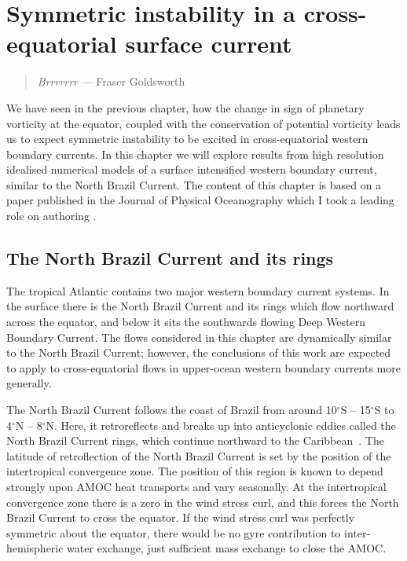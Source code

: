 \chapter{Symmetric instability in a cross-equatorial surface current}
\label{chap:3}
\begin{quote}
    \textit{Brrrrrrr} --- Fraser Goldsworth
\end{quote}

We have seen in the previous chapter, how the change in sign of planetary vorticity at the equator, coupled with the conservation of potential vorticity leads us to expect symmetric instability to be excited in cross-equatorial western boundary currents. In this chapter we will explore results from high resolution idealised numerical models of a surface intensified western boundary current, similar to the North Brazil Current. The content of this chapter is based on a paper published in the Journal of Physical Oceanography which I took a leading role on authoring \citep{Goldsworth2021a}.

\section{The North Brazil Current and its rings}
The tropical Atlantic contains two major western boundary current systems. In the surface there is the North Brazil Current and its rings which flow northward across the equator, and below it sits the southwards flowing Deep Western Boundary Current. The flows considered in this chapter are dynamically similar to the North Brazil Current; however, the conclusions of this work are expected to apply to cross-equatorial flows in upper-ocean western boundary currents more generally.

The North Brazil Current follows the coast of Brazil from around 10$^\circ$S -- 15$^\circ$S to 4$^\circ$N -- 8$^\circ$N. Here, it retroreflects and breaks up into anticyclonic eddies called the North Brazil Current rings, which continue northward to the Caribbean~\citep{Talley2011h, Fonseca2004}. The latitude of retroflection of the North Brazil Current is set by the position of the intertropical convergence zone. The position of this region is known to depend strongly upon AMOC heat transports and vary seasonally. At the intertropical convergence zone there is a zero in the wind stress curl, and this forces the North Brazil Current to cross the equator. If the wind stress curl was perfectly symmetric about the equator, there would  be no gyre contribution to inter-hemispheric water exchange, just sufficient mass exchange to close the AMOC.

